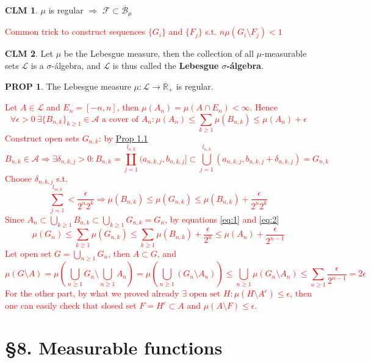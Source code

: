 \documentclass[hidelinks]{article}
\theoremstyle{definition}
\theoremstyle{dotless}
\newtheorem{proposition}{PROP}[section]
\newtheorem{claim}{CLM}[section]
\theoremstyle{remark}
\begin{document}
\begin{claim}
$\mu$ is regular $\Rightarrow$ $\mathscr{F}\subset\overline{\mathscr{B}}_\mu$
\end{claim}
\textcolor{red}{Common trick to construct sequences $\{G_i\}$ and $\{F_j\}$ s.t. $n\mu(G_i\setminus F_j)<1{}$}

\begin{claim}
Let $\mu$ be the Lebesgue measure, then the collection of all $\mu$-measurable sets $\mathscr{L}$ is a $\sigma$-álgebra, and $\mathscr{L}$ is thus called the \textbf{Lebesgue $\sigma$-álgebra}.
\end{claim}

\begin{proposition}
The Lebesgue measure $\mu:\mathscr{L}\to\overline{\mathbb{R}}_+$ is regular.
\end{proposition}
\textcolor{red}{Let $A\in\mathscr{L}$ and $E_n=[-n,n]$, then $\mu(A_n)=\mu(A\cap E_n)<\infty$. Hence \begin{equation}\label{eq:1}
\forall\epsilon>0\ \exists\{B_{n,k}\}_{k\geq1}\in\mathscr{A}\textrm{ a cover of }A_n:\mu(A_n)\leq\sum_{k\geq1}\mu(B_{n,k})\leq\mu(A_n)+\epsilon\end{equation}
Construct open sets $G_{n,k}$: by \hyperref[Prop 1.1]{Prop 1.1}
\[B_{n,k}\in\mathscr{A}\Rightarrow\exists\delta_{n,k,j}>0:B_{n,k}=\coprod_{j=1}^{l_{n,k}}(a_{n,k,j},b_{n,k,j}]\subset\bigcup_{j=1}^{l_{n,k}}(a_{n,k,j},b_{n,k,j}+\delta_{n,k,j})=G_{n,k}\]
Choose $\delta_{n,k,j}$ s.t. \begin{equation}\label{eq:2}
\sum_{j=1}^{l_{m,k}}<\frac{\epsilon}{2^n2^k}\Rightarrow\mu(B_{n,k})\leq\mu(G_{n,k})\leq\mu(B_{n,k})+\frac{\epsilon}{2^n2^k}\end{equation}
Since $A_n\subset\bigcup_{k\geq1}B_{n,k}\subset\bigcup_{k\geq1}G_{n,k}=G_n$, by equations \ref{eq:1} and \ref{eq:2}
\[\mu(G_n)\leq\sum_{k\geq1}\mu(G_{n,k})\leq\sum_{k\geq1}\mu(B_{n,k})+\frac{\epsilon}{2^n}\leq\mu(A_n)+\frac{\epsilon}{2^{n-1}}\]
Let open set $G=\bigcup_{n\geq1}G_n$, then $A\subset G$, and
\[\mu(G\setminus A)=\mu(\bigcup_{n\geq1}G_n\setminus \bigcup_{n\geq1}A_n)=\mu(\bigcup_{n\geq1}(G_n\setminus A_n))\leq\bigcup_{n\geq1}\mu(G_n\setminus A_n)\leq\sum_{n\geq1}\frac{\epsilon}{2^{n-1}}=2\epsilon\]
For the other part, by what we proved already $\exists\textrm{ open set }H:\mu(H\setminus A^c)\leq\epsilon$, then one can easily check that slosed set $F=H^c\subset A$ and $\mu(A\setminus F)\leq\epsilon$.}

\bigbreak

\section*{\S8. Measurable functions}
\setcounter{section}{8}
\end{document}
